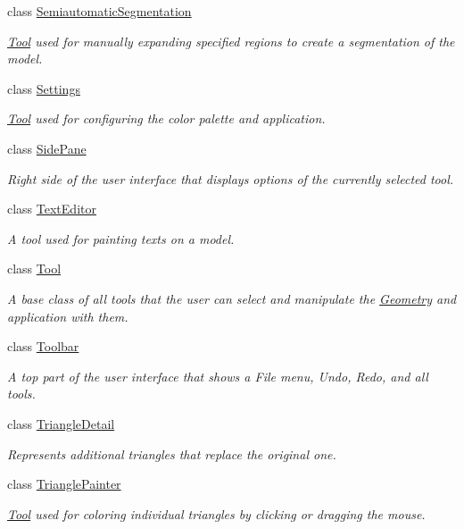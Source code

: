 \begin{DoxyCompactItemize}
class \mbox{\hyperlink{classpepr3d_1_1_semiautomatic_segmentation}{Semiautomatic\+Segmentation}}
\begin{DoxyCompactList}\small\item\em \mbox{\hyperlink{classpepr3d_1_1_tool}{Tool}} used for manually expanding specified regions to create a segmentation of the model. \end{DoxyCompactList}\item 
class \mbox{\hyperlink{classpepr3d_1_1_settings}{Settings}}
\begin{DoxyCompactList}\small\item\em \mbox{\hyperlink{classpepr3d_1_1_tool}{Tool}} used for configuring the color palette and application. \end{DoxyCompactList}\item 
class \mbox{\hyperlink{classpepr3d_1_1_side_pane}{Side\+Pane}}
\begin{DoxyCompactList}\small\item\em Right side of the user interface that displays options of the currently selected tool. \end{DoxyCompactList}\item 
class \mbox{\hyperlink{classpepr3d_1_1_text_editor}{Text\+Editor}}
\begin{DoxyCompactList}\small\item\em A tool used for painting texts on a model. \end{DoxyCompactList}\item 
class \mbox{\hyperlink{classpepr3d_1_1_tool}{Tool}}
\begin{DoxyCompactList}\small\item\em A base class of all tools that the user can select and manipulate the \mbox{\hyperlink{classpepr3d_1_1_geometry}{Geometry}} and application with them. \end{DoxyCompactList}\item 
class \mbox{\hyperlink{classpepr3d_1_1_toolbar}{Toolbar}}
\begin{DoxyCompactList}\small\item\em A top part of the user interface that shows a File menu, Undo, Redo, and all tools. \end{DoxyCompactList}\item 
class \mbox{\hyperlink{classpepr3d_1_1_triangle_detail}{Triangle\+Detail}}
\begin{DoxyCompactList}\small\item\em Represents additional triangles that replace the original one. \end{DoxyCompactList}\item 
class \mbox{\hyperlink{classpepr3d_1_1_triangle_painter}{Triangle\+Painter}}
\begin{DoxyCompactList}\small\item\em \mbox{\hyperlink{classpepr3d_1_1_tool}{Tool}} used for coloring individual triangles by clicking or dragging the mouse. \end{DoxyCompactList}\end{DoxyCompactItemize}
